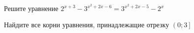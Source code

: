 \begin{ex}
	\begin{condition}
		\begin{enumcols}[label=\asbuk*)]
			\item Решите уравнение \( 2^{x+3} - 3^{x^2 + 2x-6} =  3^{x^2 + 2x - 5} - 2^x \)
			\item Найдите все корни уравнения, принадлежащие отрезку \( \left(0;3\right] \)
		\end{enumcols}
	\end{condition}
\end{ex}